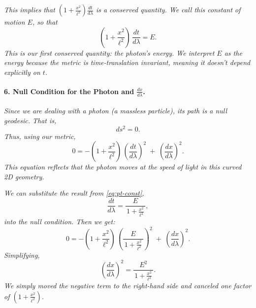 \documentclass{article}
\begin{document}


\textit{This implies that \((1 + \frac{x^2}{\ell^2}) \frac{dt}{d\lambda}\) is a conserved quantity. We call this constant of motion \(E\), so that}
\begin{equation*}\label{eq:pt-const}
\left(1 + \frac{x^2}{\ell^2}\right)\,\frac{dt}{d\lambda} = E.
\end{equation*}
\textit{This is our first conserved quantity: the photon's energy. \emph{We interpret \(E\) as the energy because the metric is time-translation invariant, meaning it doesn't depend explicitly on \(t\).}}

\paragraph{6. Null Condition for the Photon and \(\frac{dx}{d\lambda}\).}

\textit{Since we are dealing with a photon (a massless particle), its path is a \emph{null} geodesic. That is,}
\[
ds^2 = 0.
\]
\textit{Thus, using our metric,}
\begin{equation*}
0
= -\left(1 + \frac{x^2}{\ell^2}\right)\,\left(\frac{dt}{d\lambda}\right)^2
\;+\;
\left(\frac{dx}{d\lambda}\right)^2.
\end{equation*}
\textit{This equation reflects that the photon moves at the speed of light in this curved 2D geometry.}

\textit{We can substitute the result from \eqref{eq:pt-const},}
\[
\frac{dt}{d\lambda} 
= \frac{E}{\,1 + \frac{x^2}{\ell^2}\,},
\]
\textit{into the null condition. Then we get:}
\[
0
= -\left(1 + \frac{x^2}{\ell^2}\right)\,
  \left(\frac{E}{\,1 + \frac{x^2}{\ell^2}\,}\right)^2
\;+\;
\left(\frac{dx}{d\lambda}\right)^2.
\]
\textit{Simplifying,}
\[
\left(\frac{dx}{d\lambda}\right)^2 
= \frac{E^2}{\,1 + \frac{x^2}{\ell^2}\,}.
\]
\textit{We simply moved the negative term to the right-hand side and canceled one factor of \((1 + \frac{x^2}{\ell^2})\).}
\end{document}
